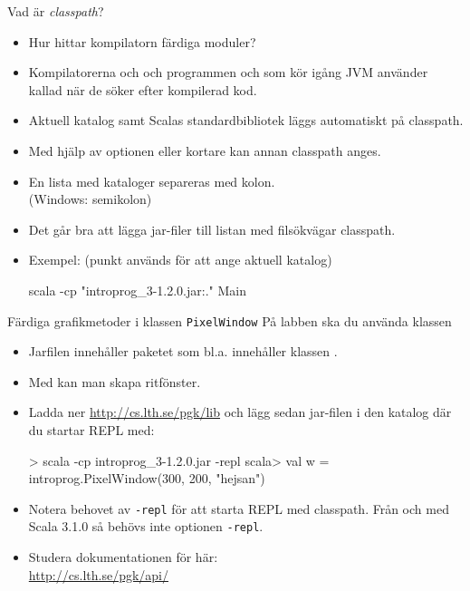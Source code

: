 \begin{Slide}{Vad är \emph{classpath}?}\SlideFontSmall
\begin{itemize}
  \item Hur hittar kompilatorn färdiga moduler?
\pause
\item Kompilatorerna  och  och programmen  och  som kör igång JVM använder  kallad  när de söker efter kompilerad kod.
\pause
\item Aktuell katalog samt Scalas standardbibliotek läggs automatiskt på classpath.
\item Med hjälp av optionen  eller kortare  kan annan classpath anges.
\item En lista med kataloger separeras med kolon.\\(Windows: semikolon)
\item Det går bra att lägga jar-filer till listan med filsökvägar classpath.
\item Exempel: (punkt används för att ange aktuell katalog)
\begin{REPLnonum}
scala -cp "introprog_3-1.2.0.jar:." Main
\end{REPLnonum}
\end{itemize}
\end{Slide}


\begin{Slide}{Färdiga grafikmetoder i klassen \texttt{PixelWindow}}\SlideFontSmall
På labben ska du använda klassen 
\begin{itemize}
\item Jarfilen  innehåller paketet  som bl.a. innehåller klassen .
\item Med  kan man skapa ritfönster.
\item Ladda ner \url{http://cs.lth.se/pgk/lib} och lägg sedan jar-filen i den katalog där du startar REPL med: 
\begin{REPLnonum}
> scala -cp introprog_3-1.2.0.jar -repl
scala> val w = introprog.PixelWindow(300, 200, "hejsan")
\end{REPLnonum}
\item Notera behovet av \texttt{-repl} för att starta REPL med classpath. Från och med Scala 3.1.0 så behövs inte optionen \texttt{-repl}.
\item Studera dokumentationen för  här: \\\url{http://cs.lth.se/pgk/api/}
\end{itemize}
\end{Slide}


